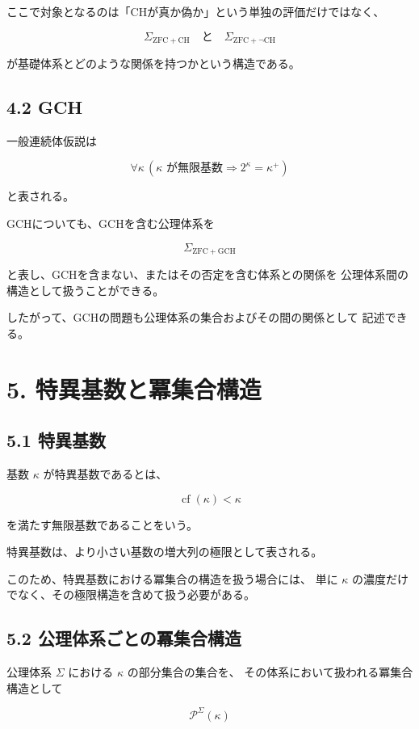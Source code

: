 \documentclass[11pt]{article}
\begin{document}
ここで対象となるのは「CHが真か偽か」という単独の評価だけではなく、

\[
\Sigma_{\mathrm{ZFC+CH}}
\quad\text{と}\quad
\Sigma_{\mathrm{ZFC+\neg CH}}
\]

が基礎体系とどのような関係を持つかという構造である。

\subsection{4.2 GCH}

一般連続体仮説は

\[
\forall\kappa\,
\left(
\kappa\text{ が無限基数}
\Rightarrow
2^\kappa=\kappa^+
\right)
\]

と表される。

GCHについても、GCHを含む公理体系を

\[
\Sigma_{\mathrm{ZFC+GCH}}
\]

と表し、GCHを含まない、またはその否定を含む体系との関係を
公理体系間の構造として扱うことができる。

したがって、GCHの問題も公理体系の集合およびその間の関係として
記述できる。

\section{5. 特異基数と冪集合構造}

\subsection{5.1 特異基数}

基数 $\kappa$ が特異基数であるとは、

\[
\operatorname{cf}(\kappa)<\kappa
\]

を満たす無限基数であることをいう。

特異基数は、より小さい基数の増大列の極限として表される。

このため、特異基数における冪集合の構造を扱う場合には、
単に $\kappa$ の濃度だけでなく、その極限構造を含めて扱う必要がある。

\subsection{5.2 公理体系ごとの冪集合構造}

公理体系 $\Sigma$ における $\kappa$ の部分集合の集合を、
その体系において扱われる冪集合構造として

\[
\mathcal{P}^{\Sigma}(\kappa)
\]
\end{document}
